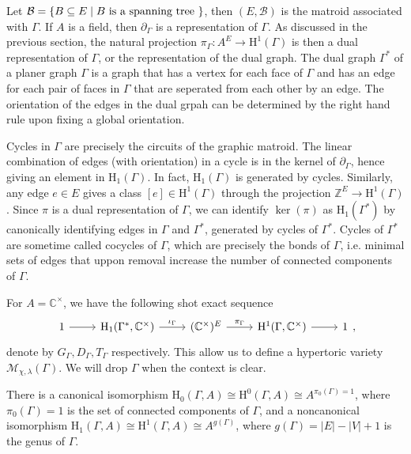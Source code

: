 \documentclass[b5paper]{article}
\newcommand{\BB}{\mathcal{B}}
\newcommand{\ZZ}{\mathbb{Z}}
\newcommand{\MM}{\mathcal{M}}
\newcommand{\HH}{\mathrm{H}}
\begin{document}
Let $\BB=\CB{B\subseteq E\mid B\textnormal{ is a spanning tree }}$, then $(E,\BB)$ is the matroid associated with $\Gamma$. If $A$ is a field, then $\partial_\Gamma$ is a representation of $\Gamma$. As discussed in the previous section, the natural projection $\pi_{\Gamma}:A^E\rightarrow \HH^1(\Gamma)$ is then a dual representation of $\Gamma$, or the representation of the dual graph. The dual graph $\Gamma^*$ of a planer graph $\Gamma$ is a graph that has a vertex for each face of $\Gamma$ and has an edge for each pair of faces in $\Gamma$ that are seperated from each other by an edge. The orientation of the edges in the dual grpah can be determined by the right hand rule upon fixing a global orientation.

Cycles in $\Gamma$ are precisely the circuits of the graphic matroid. The linear combination of edges (with orientation) in a cycle is in the kernel of $\partial_\Gamma$, hence giving an element in $\HH_1(\Gamma)$. In fact, $\HH_1(\Gamma)$ is generated by cycles.
Similarly, any edge $e \in E$ gives a class $ [e] \in \HH^1(\Gamma) $ through the projection $ \ZZ^E \to \HH^1(\Gamma) $. 
Since $\pi$ is a dual representation of $\Gamma$, we can identify $\ker(\pi)$ as $\HH_1(\Gamma^*)$ by canonically identifying edges in $\Gamma$ and $\Gamma^*$, generated by cycles of $\Gamma^*$. Cycles of $\Gamma^*$ are sometime called cocycles of $\Gamma$, which are precisely the bonds of $\Gamma$, i.e. minimal sets of edges that uppon removal increase the number of connected components of $\Gamma$.

For $A=\mathbb{C}^\times $, we have the following shot exact sequence
\begin{equation}
  \label{eq:exact_sequence_tori_graph}
    \begin{tikzcd}
      1 \arrow[r] & \HH_1(\Gamma^*,\mathbb{C}^\times ) \arrow[r, "\iota_\Gamma"] & (\mathbb{C}^\times)^E \arrow[r, "\pi_\Gamma"] & \HH^1(\Gamma, \mathbb{C}^\times) \arrow[r] & 1
    \end{tikzcd},
\end{equation}
denote by $G_\Gamma,D_\Gamma,T_\Gamma$ respectively. This allow us to define a hypertoric variety $\MM_{\chi,\lambda}(\Gamma)$. We will drop $\Gamma$ when the context is clear. 

There is a canonical isomorphism $\HH_0(\Gamma, A) \cong \HH^0(\Gamma, A) \cong A^{\pi_0(\Gamma)=1} $, where $\pi_0(\Gamma)=1$ is the set of connected components of $\Gamma$, and a noncanonical isomorphism $ \HH_1(\Gamma, A) \cong \HH^1(\Gamma, A) \cong A^{g(\Gamma)} $, where $g(\Gamma)=|E|-|V|+1$ is the genus of $\Gamma$.
\end{document}
